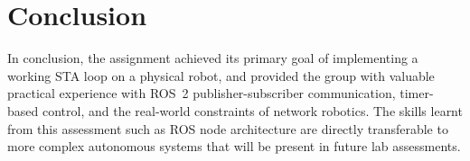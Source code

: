 \documentclass[11 pt , a 4 paper ]{article}
\theoremstyle{definition}
\begin{document}
\section{Conclusion}

In conclusion, the assignment achieved its primary goal of implementing a working STA loop on a physical robot, and provided the group with valuable practical experience with ROS~2 publisher-subscriber communication, timer-based control, and the real-world constraints of network robotics. The skills learnt from this assessment such as ROS node architecture are directly transferable to more complex autonomous systems that will be present in future lab assessments.
\end{document}
